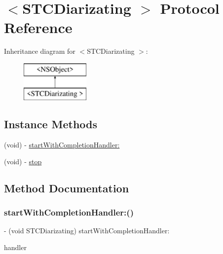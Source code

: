 \hypertarget{protocol_s_t_c_diarizating_01-p}{}\section{$<$S\+T\+C\+Diarizating $>$ Protocol Reference}
\label{protocol_s_t_c_diarizating_01-p}
Inheritance diagram for $<$S\+T\+C\+Diarizating $>$\+:\begin{figure}[H]
\begin{center}
\leavevmode
\includegraphics[height=2.000000cm]{protocol_s_t_c_diarizating_01-p}
\end{center}
\end{figure}
\subsection*{Instance Methods}
\begin{DoxyCompactItemize}
\item 
(void) -\/ \hyperlink{protocol_s_t_c_diarizating_01-p_a7ea8a7e3542f67448914b52145ea0de8}{start\+With\+Completion\+Handler\+:}
\item 
(void) -\/ \hyperlink{protocol_s_t_c_diarizating_01-p_a0f4cd3cf11e87cbcfc4c4e96f49a74ba}{stop}
\end{DoxyCompactItemize}


\subsection{Method Documentation}
\hypertarget{protocol_s_t_c_diarizating_01-p_a7ea8a7e3542f67448914b52145ea0de8}{}\label{protocol_s_t_c_diarizating_01-p_a7ea8a7e3542f67448914b52145ea0de8} 
\subsubsection{\texorpdfstring{start\+With\+Completion\+Handler\+:()}{startWithCompletionHandler:()}}
{\footnotesize\ttfamily -\/ (void S\+T\+C\+Diarizating) start\+With\+Completion\+Handler\+: \begin{DoxyParamCaption}\item[{(Diarization\+Completion\+Handler)}]{handler }\end{DoxyParamCaption}}

